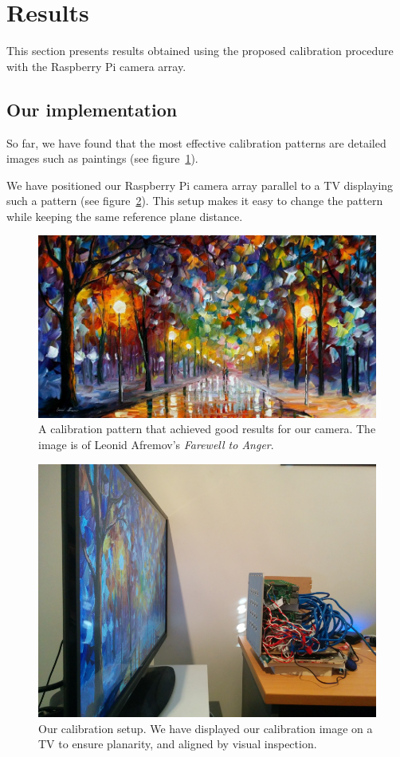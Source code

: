 \documentclass[../main.tex]{subfiles}
\begin{document}
\section{Results} \label{sec:results}
This section presents results obtained using the proposed calibration procedure with the Raspberry Pi camera array.

\subsection{Our implementation} \label{sec:calibration-implementation}
So far, we have found that the most effective calibration patterns are detailed images such as paintings (see figure~\ref{fig:calibration-pattern}).

We have positioned our Raspberry Pi camera array parallel to a TV displaying such a pattern (see figure~\ref{fig:calibration-setup}). This setup makes it easy to change the pattern while keeping the same reference plane distance.

\begin{figure}[H]
    \centering
    \includegraphics[width=\linewidth]{images/calibration-pattern}
    \caption{A calibration pattern that achieved good results for our camera. The image is of Leonid Afremov's \emph{Farewell to Anger}.}
    \label{fig:calibration-pattern}
\end{figure}

\begin{figure}[H]
    \centering
    \includegraphics[width=0.85\linewidth]{images/calibration-setup}
    \caption{Our calibration setup. We have displayed our calibration image on a TV to ensure planarity, and aligned by visual inspection.}
    \label{fig:calibration-setup}
\end{figure}
\end{document}

